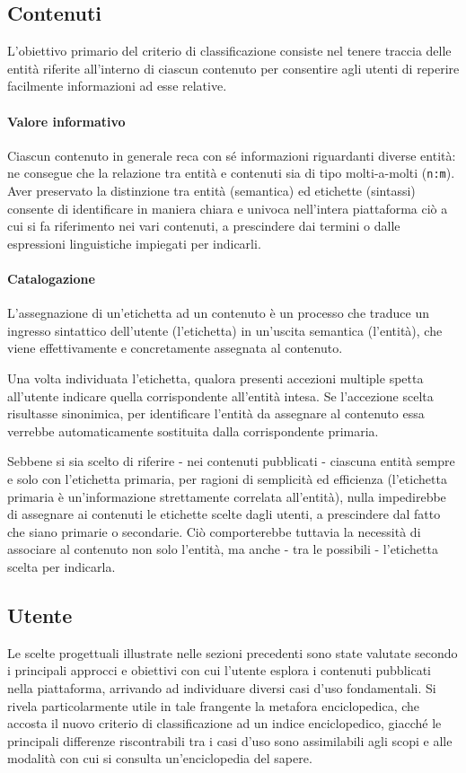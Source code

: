 \subsection{Contenuti}  
L'obiettivo primario del criterio di classificazione consiste nel tenere traccia delle entità riferite all'interno di ciascun contenuto per consentire agli utenti di reperire facilmente informazioni ad esse relative.

\paragraph{Valore informativo}
Ciascun contenuto in generale reca con sé informazioni riguardanti diverse entità: ne consegue che la relazione tra entità e contenuti sia di tipo molti-a-molti (\texttt{n:m}). Aver preservato la distinzione tra entità (semantica) ed etichette (sintassi) consente di identificare in maniera chiara e univoca nell'intera piattaforma ciò a cui si fa riferimento nei vari contenuti, a prescindere dai termini o dalle espressioni linguistiche impiegati per indicarli.

\paragraph{Catalogazione}
L'assegnazione di un'etichetta ad un contenuto è un processo che traduce un ingresso sintattico dell'utente (l'etichetta) in un'uscita semantica (l'entità), che viene effettivamente e concretamente assegnata al contenuto.

Una volta individuata l'etichetta, qualora presenti accezioni multiple spetta all'utente indicare quella corrispondente all'entità intesa. Se l'accezione scelta risultasse sinonimica, per identificare l'entità da assegnare al contenuto essa verrebbe automaticamente sostituita dalla corrispondente primaria.

Sebbene si sia scelto di riferire - nei contenuti pubblicati - ciascuna entità sempre e solo con l'etichetta primaria, per ragioni di semplicità ed efficienza (l'etichetta primaria è un'informazione strettamente correlata all'entità), nulla impedirebbe di assegnare ai contenuti le etichette scelte dagli utenti, a prescindere dal fatto che siano primarie o secondarie. Ciò comporterebbe tuttavia la necessità di associare al contenuto non solo l'entità, ma anche - tra le possibili - l'etichetta scelta per indicarla.

\subsection{Utente}
Le scelte progettuali illustrate nelle sezioni precedenti sono state valutate secondo i principali approcci e obiettivi con cui l'utente esplora i contenuti pubblicati nella piattaforma, arrivando ad individuare diversi casi d'uso fondamentali. Si rivela particolarmente utile in tale frangente la metafora enciclopedica, che accosta il nuovo criterio di classificazione ad un indice enciclopedico, giacché le principali differenze riscontrabili tra i casi d'uso sono assimilabili agli scopi e alle modalità con cui si consulta un'enciclopedia del sapere. 

